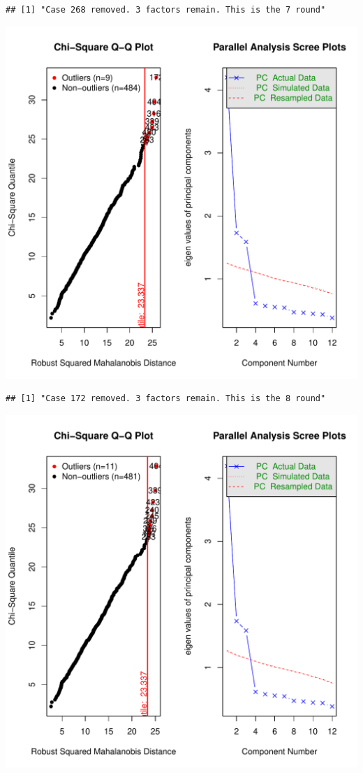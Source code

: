 \documentclass{article}\usepackage[]{graphicx}\usepackage[]{color}
\makeatletter
\def\maxwidth{ %
  \ifdim\Gin@nat@width>\linewidth
    \linewidth
  \else
    \Gin@nat@width
  \fi
}
\newenvironment{kframe}{%
 \def\at@end@of@kframe{}%
 \ifinner\ifhmode%
  \def\at@end@of@kframe{\end{minipage}}%
  \begin{minipage}{\columnwidth}%
 \fi\fi%
 \def\FrameCommand##1{\hskip\@totalleftmargin \hskip-\fboxsep
 \colorbox{shadecolor}{##1}\hskip-\fboxsep
     \hskip-\linewidth \hskip-\@totalleftmargin \hskip\columnwidth}%
 \MakeFramed {\advance\hsize-\width
   \@totalleftmargin\z@ \linewidth\hsize
   \@setminipage}}%
 {\par\unskip\endMakeFramed%
 \at@end@of@kframe}
\newenvironment{knitrout}{}{} %
\makeatother
\begin{document}
\begin{knitrout}
\begin{kframe}\begin{verbatim}
## [1] "Case 268 removed. 3 factors remain. This is the 7 round"
\end{verbatim}
\end{kframe}
\includegraphics[width=\maxwidth]{figure/unnamed-chunk-10-8} 
\begin{kframe}\begin{verbatim}
## [1] "Case 172 removed. 3 factors remain. This is the 8 round"
\end{verbatim}
\end{kframe}
\includegraphics[width=\maxwidth]{figure/unnamed-chunk-10-9} 

\end{knitrout}
\end{document}
